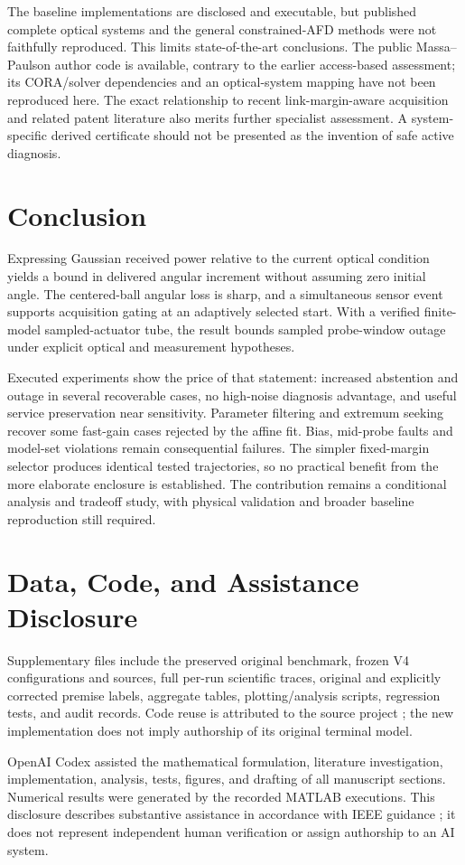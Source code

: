 \documentclass[10pt,journal]{IEEEtran}
\begin{document}
The baseline implementations are disclosed and executable, but published complete optical systems and the general constrained-AFD methods were not faithfully reproduced. This limits state-of-the-art conclusions. The public Massa--Paulson author code is available, contrary to the earlier access-based assessment; its CORA/solver dependencies and an optical-system mapping have not been reproduced here. The exact relationship to recent link-margin-aware acquisition and related patent literature also merits further specialist assessment. A system-specific derived certificate should not be presented as the invention of safe active diagnosis.

\section{Conclusion}
Expressing Gaussian received power relative to the current optical condition yields a bound in delivered angular increment without assuming zero initial angle. The centered-ball angular loss is sharp, and a simultaneous sensor event supports acquisition gating at an adaptively selected start. With a verified finite-model sampled-actuator tube, the result bounds sampled probe-window outage under explicit optical and measurement hypotheses.

Executed experiments show the price of that statement: increased abstention and outage in several recoverable cases, no high-noise diagnosis advantage, and useful service preservation near sensitivity. Parameter filtering and extremum seeking recover some fast-gain cases rejected by the affine fit. Bias, mid-probe faults and model-set violations remain consequential failures. The simpler fixed-margin selector produces identical tested trajectories, so no practical benefit from the more elaborate enclosure is established. The contribution remains a conditional analysis and tradeoff study, with physical validation and broader baseline reproduction still required.

\section*{Data, Code, and Assistance Disclosure}
Supplementary files include the preserved original benchmark, frozen V4 configurations and sources, full per-run scientific traces, original and explicitly corrected premise labels, aggregate tables, plotting/analysis scripts, regression tests, and audit records. Code reuse is attributed to the source project \cite{source}; the new implementation does not imply authorship of its original terminal model.

OpenAI Codex assisted the mathematical formulation, literature investigation, implementation, analysis, tests, figures, and drafting of all manuscript sections. Numerical results were generated by the recorded MATLAB executions. This disclosure describes substantive assistance in accordance with IEEE guidance \cite{aipolicy}; it does not represent independent human verification or assign authorship to an AI system.


\end{document}
